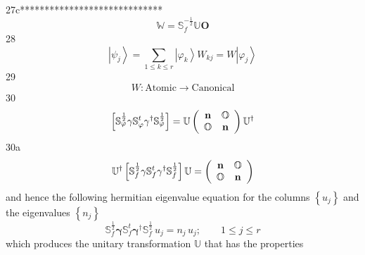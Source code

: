 \documentclass[aps,preprint]{revtex4}%
\begin{document}
27c*****************************%
\[
\mathbb{W}=\mathbb{S}_{f}^{-\frac{1}{2}}\mathbb{U}\mathbf{O}%
\]
28%
\[
\left\vert \psi_{j}\right\rangle =\sum_{1\leq k\leq r}\left\vert \varphi
_{k}\right\rangle W_{kj}=W\left\vert \varphi_{j}\right\rangle
\]
29%
\[
W:\text{Atomic}\rightarrow\text{Canonical}%
\]
30%
\[
\left[  \mathbb{S}_{\varphi}^{\frac{1}{2}}\mathbf{\gamma}\mathbb{S}_{\varphi
}^{t}\mathbf{\gamma}^{\dagger}\mathbb{S}_{\varphi}^{\frac{1}{2}}\right]
=\mathbb{U}\left(
\begin{array}
[c]{cc}%
\mathbf{n} & \mathbb{O}\\
\mathbb{O} & \mathbf{n}%
\end{array}
\right)  \mathbb{U}^{\dagger}%
\]
30a%
\[
\mathbb{U}^{\dagger}\left[  \mathbb{S}_{f}^{\frac{1}{2}}\mathbf{\gamma
}\mathbb{S}_{f}^{t}\mathbf{\gamma}^{\dagger}\mathbb{S}_{f}^{\frac{1}{2}%
}\right]  \mathbb{U}=\left(
\begin{array}
[c]{cc}%
\mathbf{n} & \mathbb{O}\\
\mathbb{O} & \mathbf{n}%
\end{array}
\right)
\]
and hence the following hermitian eigenvalue equation for the columns
$\left\{  u_{j}\right\}  $ and the eigenvalues $\left\{  n_{j}\right\}  $
\[
\mathbb{S}_{f}^{\frac{1}{2}}\mathbf{\gamma}\mathbb{S}_{f}^{t}\mathbf{\gamma
}^{\dagger}\mathbb{S}_{f}^{\frac{1}{2}}\mathbf{\,}u_{j}=n_{j}\,u_{j}%
;\qquad1\leq j\leq r
\]
which produces the unitary transformation $\mathbb{U}$ that has the properties
\end{document}
